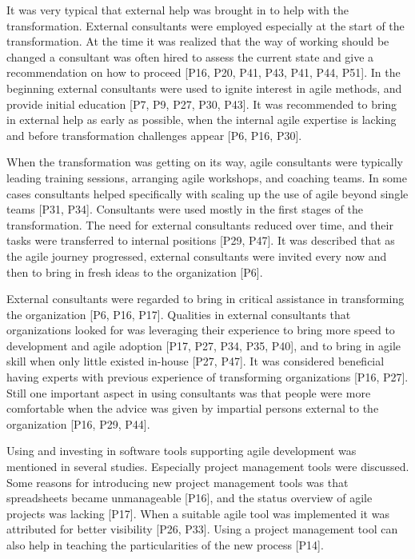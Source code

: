 \documentclass[preprint,authoryear,12pt]{elsarticle}
\begin{document}

It was very typical that external help was brought in to help with the
transformation.
External consultants were employed especially at the start of the
transformation. At the time it was realized that the way of working should be
changed a consultant was often hired to assess the current state and give a
recommendation on how to proceed [P16, P20, P41, P43, P41, P44, P51].
In the beginning external consultants were used to ignite interest in agile
methods, and provide initial education [P7, P9, P27, P30, P43].
It was recommended to bring in external help as early as possible, when the
internal agile expertise is lacking and before transformation challenges appear
[P6, P16, P30].

When the transformation was getting on its way, agile consultants were typically
leading training sessions, arranging agile workshops, and coaching teams.
In some cases consultants helped specifically with scaling up the use of agile
beyond single teams [P31, P34].
Consultants were used mostly in the first stages of the transformation.
The need for external consultants reduced over time, and their tasks were
transferred to internal positions [P29, P47].
It was described that as the agile journey progressed, external consultants were
invited every now and then to bring in fresh ideas to the organization [P6].

External consultants were regarded to bring in critical assistance in
transforming the organization [P6, P16, P17]. Qualities in external consultants
that organizations looked for was leveraging their experience to bring more
speed to development and agile adoption [P17, P27, P34, P35, P40], and to bring
in agile skill when only little existed in-house [P27, P47]. It was considered
beneficial having experts with previous experience of transforming organizations
[P16, P27].
Still one important aspect in using consultants was that people were more
comfortable when the advice was given by impartial persons external to the
organization [P16, P29, P44].




Using and investing in software tools supporting agile development was mentioned
in several studies. Especially project management tools were discussed.
Some reasons for introducing new project management tools was that spreadsheets
became unmanageable [P16], and the status overview of agile projects was lacking
[P17]. When a suitable agile tool was implemented it was attributed for better
visibility [P26, P33]. Using a project management tool can also help in teaching
the particularities of the new process [P14].
\end{document}
